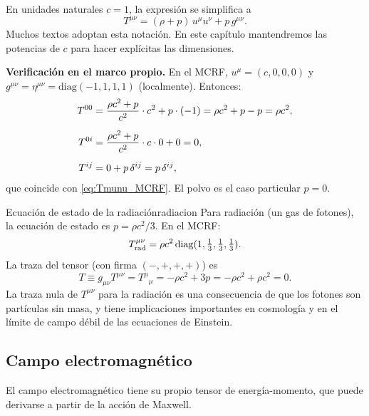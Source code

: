 \begin{importante}
En unidades naturales $c = 1$, la expresión se simplifica a
\begin{equation}
  T^{\mu\nu} = (\rho + p)\,u^\mu u^\nu + p\,g^{\mu\nu}.
  \label{eq:Tmunu_fluido_nat}
\end{equation}
Muchos textos adoptan esta notación. En este capítulo mantendremos las potencias de $c$ para hacer explícitas las dimensiones.
\end{importante}

\textbf{Verificación en el marco propio.} En el MCRF, $u^\mu = (c, 0, 0, 0)$ y $g^{\mu\nu} = \eta^{\mu\nu} = \mathrm{diag}(-1,1,1,1)$ (localmente). Entonces:
\begin{align}
  T^{00} &= \frac{\rho c^2 + p}{c^2}\cdot c^2 + p\cdot(-1) = \rho c^2 + p - p = \rho c^2, \nl
  T^{0i} &= \frac{\rho c^2 + p}{c^2}\cdot c\cdot 0 + 0 = 0, \nl
  T^{ij} &= 0 + p\,\delta^{ij} = p\,\delta^{ij},
\end{align}
que coincide con \eqref{eq:Tmunu_MCRF}. El polvo es el caso particular $p = 0$.

\begin{ejemplo}{Ecuación de estado de la radiación}{radiacion}
Para radiación (un gas de fotones), la ecuación de estado es $p = \rho c^2/3$. En el MCRF:
\begin{equation}
  T^{\mu\nu}_{\rm rad} = \rho c^2\,\mathrm{diag}(1, \tfrac{1}{3}, \tfrac{1}{3}, \tfrac{1}{3}).
\end{equation}
La traza del tensor (con firma $(-,+,+,+)$) es
\begin{equation}
  T \equiv g_{\mu\nu}T^{\mu\nu} = T^\mu{}_\mu = -\rho c^2 + 3p = -\rho c^2 + \rho c^2 = 0.
\end{equation}
La traza nula de $T^{\mu\nu}$ para la radiación es una consecuencia de que los fotones son partículas sin masa, y tiene implicaciones importantes en cosmología y en el límite de campo débil de las ecuaciones de Einstein.
\end{ejemplo}

\subsection{Campo electromagnético}

El campo electromagnético tiene su propio tensor de energía-momento, que puede derivarse a partir de la acción de Maxwell.

